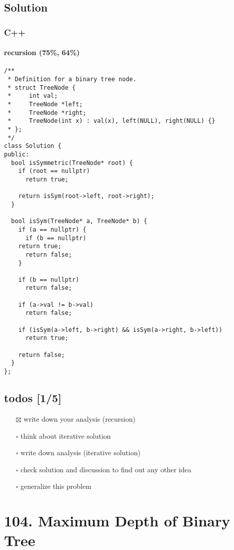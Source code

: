 \documentclass[12pt]{book}
\begin{document}
\section{Solution}
\label{sec:orgfecbba5}
\subsection{C++}
\label{sec:org773df3d}
\subsubsection{recursion (75\%, 64\%)}
\label{sec:org6a4d812}
\begin{verbatim}
/**
 * Definition for a binary tree node.
 * struct TreeNode {
 *     int val;
 *     TreeNode *left;
 *     TreeNode *right;
 *     TreeNode(int x) : val(x), left(NULL), right(NULL) {}
 * };
 */
class Solution {
public:
  bool isSymmetric(TreeNode* root) {
    if (root == nullptr)
      return true;

    return isSym(root->left, root->right);
  }

  bool isSym(TreeNode* a, TreeNode* b) {
    if (a == nullptr) {
      if (b == nullptr)
	return true;
      return false;
    }

    if (b == nullptr)
      return false;

    if (a->val != b->val)
      return false;

    if (isSym(a->left, b->right) && isSym(a->right, b->left))
      return true;

    return false;
  }
};

\end{verbatim}
\section{todos [1/5]}
\label{sec:org00fd1c5}
\begin{itemize}
\item[{$\boxtimes$}] write down your analysis (recursion)
\item[{$\square$}] think about iterative solution
\item[{$\square$}] write down analysis (iterative solution)
\item[{$\square$}] check solution and discussion to find out any other idea
\item[{$\square$}] generalize this problem
\end{itemize}

\chapter{104. Maximum Depth of Binary Tree}
\label{sec:orgd686b86}
\end{document}
